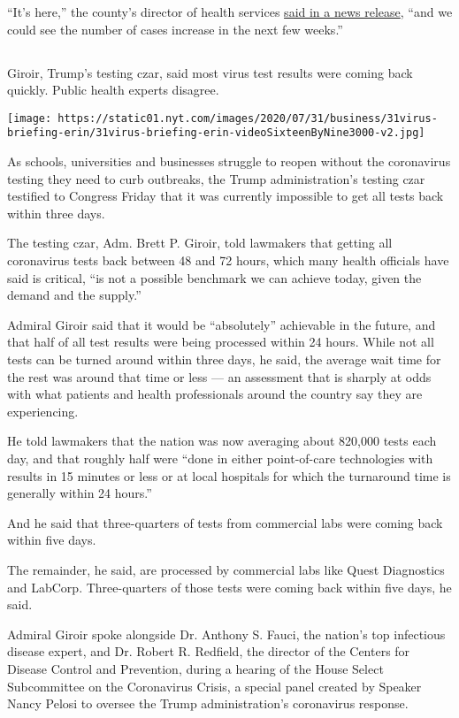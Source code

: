 ``It's here,'' the county's director of health services
\href{http://modochealthservices.org/corona-virus}{said in a news
release}, ``and we could see the number of cases increase in the next
few weeks.''

\hypertarget{-2}{%
\subsection{}\label{-2}}

Giroir, Trump's testing czar, said most virus test results were coming
back quickly. Public health experts disagree.

\texttt{[image: https://static01.nyt.com/images/2020/07/31/business/31virus-briefing-erin/31virus-briefing-erin-videoSixteenByNine3000-v2.jpg]}

As schools, universities and businesses struggle to reopen without the
coronavirus testing they need to curb outbreaks, the Trump
administration's testing czar testified to Congress Friday that it was
currently impossible to get all tests back within three days.

The testing czar, Adm. Brett P. Giroir, told lawmakers that getting all
coronavirus tests back between 48 and 72 hours, which many health
officials have said is critical, ``is not a possible benchmark we can
achieve today, given the demand and the supply.''

Admiral Giroir said that it would be ``absolutely'' achievable in the
future, and that half of all test results were being processed within 24
hours. While not all tests can be turned around within three days, he
said, the average wait time for the rest was around that time or less
--- an assessment that is sharply at odds with what patients and health
professionals around the country say they are experiencing.

He told lawmakers that the nation was now averaging about 820,000 tests
each day, and that roughly half were ``done in either point-of-care
technologies with results in 15 minutes or less or at local hospitals
for which the turnaround time is generally within 24 hours.''

And he said that three-quarters of tests from commercial labs were
coming back within five days.

The remainder, he said, are processed by commercial labs like Quest
Diagnostics and LabCorp. Three-quarters of those tests were coming back
within five days, he said.

Admiral Giroir spoke alongside Dr. Anthony S. Fauci, the nation's top
infectious disease expert, and Dr. Robert R. Redfield, the director of
the Centers for Disease Control and Prevention, during a hearing of the
House Select Subcommittee on the Coronavirus Crisis, a special panel
created by Speaker Nancy Pelosi to oversee the Trump administration's
coronavirus response.

